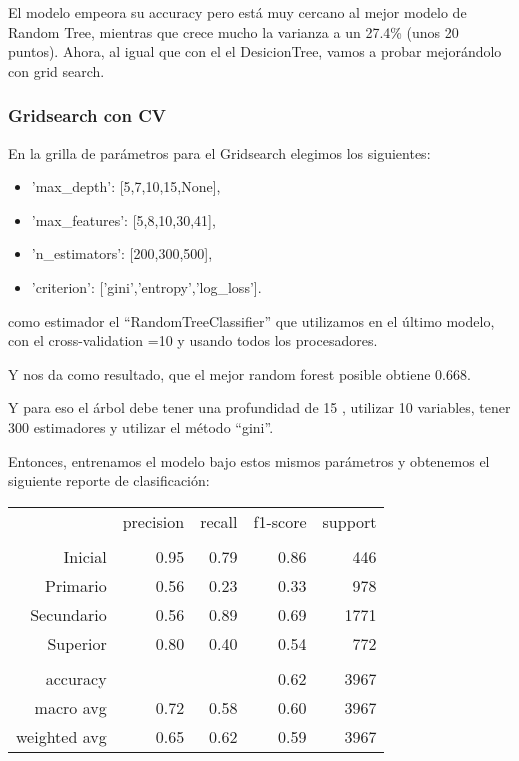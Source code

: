 \documentclass[a4paper]{article}
\begin{document}
            El modelo empeora su accuracy pero está muy cercano al mejor modelo de Random Tree, mientras que crece mucho la varianza a un 27.4\% (unos 20 puntos). Ahora, al igual que con el el DesicionTree, vamos a probar mejorándolo con grid search.

        \subsubsection{Gridsearch con CV}

            En la grilla de parámetros para el Gridsearch elegimos los siguientes:
            \begin{itemize}
                \item 'max\_depth': [5,7,10,15,None],
                \item 'max\_features': [5,8,10,30,41],
                \item 'n\_estimators': [200,300,500],
                \item 'criterion': ['gini','entropy','log\_loss'].
            \end{itemize}
            como estimador el ``RandomTreeClassifier'' que utilizamos en el último modelo, con el cross-validation =10 y  usando todos los procesadores.

            Y nos da como resultado, que el mejor random forest posible obtiene 0.668. 

            Y para eso el árbol debe tener una profundidad de 15 , utilizar  10  variables, tener  300  estimadores y utilizar el método ``gini''.
            
            Entonces, entrenamos el modelo bajo estos mismos parámetros y obtenemos el siguiente reporte de clasificación:

            \begin{table}[!ht]
                \centering
                \begin{tabular}{rrrrr}
                    ~ & precision & recall & f1-score & support \\
                    & & & & \\
                    Inicial    & 0.95 & 0.79 & 0.86 & 446 \\
                    Primario   & 0.56 & 0.23 & 0.33 & 978 \\
                    Secundario & 0.56 & 0.89 & 0.69 & 1771 \\
                    Superior   & 0.80 & 0.40 & 0.54 & 772 \\
                    & & & & \\
                    accuracy & & & 0.62 & 3967 \\
                    macro avg & 0.72 & 0.58 & 0.60 & 3967 \\
                    weighted avg & 0.65 & 0.62 & 0.59 & 3967 \\
                \end{tabular}
            \end{table}
            
\end{document}
